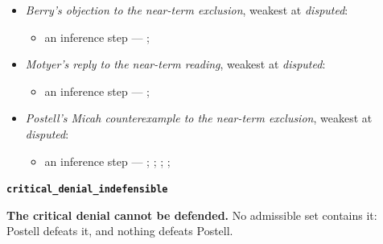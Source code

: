 \documentclass[11pt]{article}
\begin{document}
\begin{itemize}
\begin{itemize}
\item An oracle’s meaning in the finished book is set by its literary placement --- \cite[476--479]{postell-isaiah-messianic-2025}
\item Read compositionally, Isaiah 7:14 anticipates a future, miraculous birth --- \cite[490--493]{postell-isaiah-messianic-2025}
\item Mary conceived Jesus while a virgin --- Matt 1:18-25; Luke 1:26-38; \cite[30--33]{brown-problem-virginal-conception-1972}
\item an inference step --- \cite[ad loc. Isa 7:14]{motyer-isaiah-1993}
\item an inference step --- \cite{miravalle-meet-your-mother-2014}
\item an inference step --- \cite{miravalle-introduction-mary-2020}
\item an inference step --- \cite[490--493]{postell-isaiah-messianic-2025}
\item an inference step --- \cite[ad loc. Matt 1:23]{france-matthew-2007}
\end{itemize}
\item \emph{Berry’s objection to the near-term exclusion}, weakest at \emph{disputed}:
\begin{itemize}
\item an inference step --- \cite[1653--1654]{berry-virgin-birth-2003}; \cite[5]{compton-immanuel-prophecy-2007}
\end{itemize}
\item \emph{Motyer’s reply to the near-term reading}, weakest at \emph{disputed}:
\begin{itemize}
\item an inference step --- \cite[124]{motyer-context-content-1970}; \cite[5]{compton-immanuel-prophecy-2007}
\end{itemize}
\item \emph{Postell’s Micah counterexample to the near-term exclusion}, weakest at \emph{disputed}:
\begin{itemize}
\item an inference step --- \cite[481]{postell-isaiah-messianic-2025}; \cite[ad loc. Mic 5:1]{rashi-commentary-prophets-1100}; \cite[ad loc. Mic 5:4]{rashi-commentary-prophets-1100}; \cite[ad loc. Isa 7:14]{rashi-commentary-prophets-1100}; \cite[ad loc. Isa 7:14]{ibn-ezra-commentary-isaiah-1145}
\end{itemize}
\end{itemize}
\par\medskip\noindent\textbf{\texttt{critical\_\allowbreak{}denial\_\allowbreak{}indefensible}}\par\nobreak\noindent
\textbf{The critical denial cannot be defended.} No admissible set contains it: Postell defeats it, and nothing defeats Postell.
\end{document}
